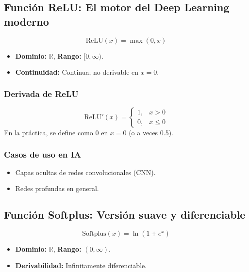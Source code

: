 \documentclass[12pt,a4paper,openany,oneside]{book}
\begin{document}
\subsection{Función ReLU: El motor del Deep Learning moderno}

\begin{equation}
\text{ReLU}(x) = \max(0, x)
\end{equation}

\begin{itemize}
    \item \textbf{Dominio:} $\mathbb{R}$, \textbf{Rango:} $[0, \infty)$.
    \item \textbf{Continuidad:} Continua; no derivable en $x=0$.
\end{itemize}

\subsubsection{Derivada de ReLU}
\[
\text{ReLU}'(x) = 
\begin{cases}
1, & x > 0 \\
0, & x \le 0
\end{cases}
\]
En la práctica, se define como 0 en $x=0$ (o a veces 0.5).

\subsubsection{Casos de uso en IA}
\begin{itemize}
    \item Capas ocultas de redes convolucionales (CNN).
    \item Redes profundas en general.
\end{itemize}

\subsection{Función Softplus: Versión suave y diferenciable}

\begin{equation}
\text{Softplus}(x) = \ln(1 + e^x)
\end{equation}

\begin{itemize}
    \item \textbf{Dominio:} $\mathbb{R}$, \textbf{Rango:} $(0, \infty)$.
    \item \textbf{Derivabilidad:} Infinitamente diferenciable.
\end{itemize}
\end{document}

